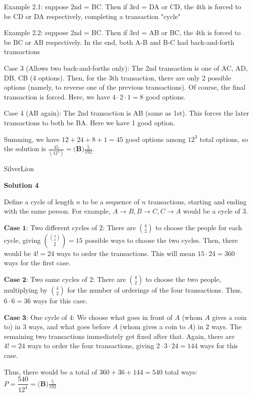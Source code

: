\begin{enumerate}
 Example 2.1: suppose 2nd = BC. Then if 3rd = DA or CD, the 4th is forced to be CD or DA respectively, completing a transaction "cycle"

 Example 2.2: suppose 2nd = BC. Then if 3rd = AB or BC, the 4th is forced to be BC or AB respectively. In the end, both A-B and B-C had back-and-forth transactions

 Case 3 (Allows two back-and-forths only): The 2nd transaction is one of AC, AD, DB, CB (4 options). Then, for the 3th transaction, there are only 2 possible options (namely, to reverse one of the previous transactions). Of course, the final transaction is forced. Here, we have $4\cdot 2\cdot 1 = 8$ good options.

 Case 4 (AB again): The 2nd transaction is AB (same as 1st). This forces the later transactions to both be BA. Here we have 1 good option.

 Summing, we have $12+24+8+1=45$ good options among $12^3$ total options, so the solution is $\frac{45}{(12^3)}= \boxed{\textbf{(B)}\frac{5}{192}}$. 

 SilverLion

 


 



\textbf{Solution 4}

Define a cycle of length $n$ to be a sequence of $n$ transactions, starting and ending with the same person. For example, $A \to B, B \to C, C \to A$ would be a cycle of $3$.

 $\textbf{Case 1}$: Two different cycles of $2$: There are $\binom{4}{2}$ to choose the people for each cycle, giving $\binom{\binom{4}{2}}{2} = 15$ possible ways to choose the two cycles. Then, there would be $4! = 24$ ways to order the transactions. This will mean $15\cdot 24 = 360$ ways for the first case.

 $\textbf{Case 2}$: Two same cycles of $2$: There are $\binom{4}{2}$ to choose the two people, multiplying by $\binom{4}{2}$ for the number of orderings of the four transactions. Thus, $6\cdot 6 = 36$ ways for this case.

 $\textbf{Case 3}$: One cycle of $4$: We choose what goes in front of $A$ (whom $A$ gives a coin to) in $3$ ways, and what goes before $A$ (whom gives a coin to $A$) in $2$ ways. The remaining two transactions immediately get fixed after that. Again, there are $4! = 24$ ways to order the four transactions, giving $2\cdot 3\cdot 24 = 144$ ways for this case.

 Thus, there would be a total of $360+36+144 = 540$ total ways: $P = \dfrac{540}{12^4} = \boxed{\textbf{(B)}\frac{5}{192}}$


\end{enumerate}
